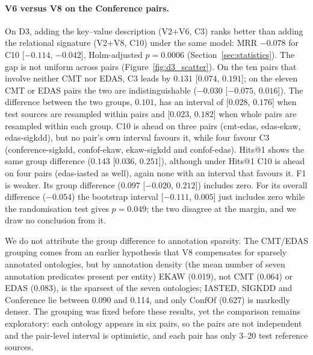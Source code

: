 
\paragraph{V6 versus V8 on the Conference pairs.}
On D3, adding the key--value description (V2+V6, C3) ranks better than adding
the relational signature (V2+V8, C10) under the same model: MRR
$-0.078$ for C10 [$-0.114$, $-0.042$], Holm-adjusted $p=0.0006$
(Section~\ref{sec:statistics}). The gap is
not uniform across pairs (Figure~\ref{fig:d3_scatter}). On the ten pairs that
involve neither CMT nor EDAS, C3 leads by $0.131$ [$0.074$, $0.191$]; on the
eleven CMT or EDAS pairs the two are indistinguishable ($-0.030$
[$-0.075$, $0.016$]). The difference between the two groups, $0.101$, has an
interval of [$0.028$, $0.176$] when test sources are resampled within pairs
and [$0.023$, $0.182$] when whole pairs are resampled within each group.
C10 is ahead on three pairs (cmt-edas, edas-ekaw, edas-sigkdd), but no
pair's own interval favours it, while four favour C3 (conference-sigkdd,
confof-ekaw, ekaw-sigkdd and confof-edas). Hits@1 shows the same group
difference ($0.143$ [$0.036$, $0.251$]), although under Hits@1 C10 is ahead
on four pairs (edas-iasted as well), again none with an interval that
favours it. F1 is weaker. Its group difference ($0.097$ [$-0.020$, $0.212$])
includes zero. For its overall difference ($-0.054$) the bootstrap interval
[$-0.111$, $0.005$] just includes zero while the randomisation test gives
$p=0.049$; the two disagree at the margin, and we draw no conclusion from it.

We do not attribute the group difference to annotation sparsity. The
CMT/EDAS grouping comes from an earlier hypothesis that V8 compensates for
sparsely annotated ontologies, but by annotation density (the mean number
of seven annotation predicates present per entity) EKAW (0.019), not CMT
(0.064) or EDAS (0.083), is the sparsest of the seven ontologies; IASTED,
SIGKDD and Conference lie between 0.090 and 0.114, and only ConfOf (0.627)
is markedly denser. The grouping was fixed before these results, yet the
comparison remains exploratory: each ontology appears in six pairs, so the
pairs are not independent and the pair-level interval is optimistic, and
each pair has only 3--20 test reference sources.


